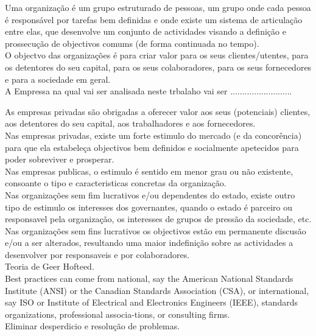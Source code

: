 Uma organização é um grupo estruturado de pessoas, um grupo onde cada pessoa é responsável por tarefas bem definidas e onde existe um sistema de articulação entre elas, que desenvolve um conjunto de actividades visando a definição e prossecução de objectivos comums (de forma continuada no tempo).\\

O objectvo das organizações é para criar valor para os seus clientes/utentes, para os detentores do seu capital, para os seus colaboradores, para os seus fornecedores e para a sociedade em geral.\\

A Empressa na qual vai ser analisada neste trbalaho vai ser ..........................

As empresas privadas são obrigadas a oferecer valor aos seus (potenciais) clientes, aos detentores do seu capital, aos trabalhadores e aos fornecedores.\\
Nas empresas privadas, existe um forte estimulo do mercado (e da concorência) para que ela estabeleça objectivos bem definidos e socialmente apetecidos para poder sobreviver e prosperar.\\

Nas empresas publicas, o estimulo é sentido em menor grau ou não existente, consoante o tipo e caracteristicas concretas da organização.\\

Nas organizações sem fim lucrativos e/ou dependentes do estado, existe outro tipo de estimulo os interesses dos governantes, quando o estado é parceiro ou responsavel pela organização, os interesses de grupos de pressão da sociedade, etc.\\

Nas organizações sem fins lucrativos os objectivos estão em permanente discusão e/ou a ser alterados, resultando uma maior indefinição sobre as actividades a desenvolver por responsaveis e por colaboradores.\\

Teoria de Geer Hofteed.\\

Best practices can come from national, say the American National Standards Institute (ANSI) or the Canadian Standards Association (CSA), or international, say ISO or Institute of Electrical and Electronics Engineers (IEEE), standards organizations, professional associa-tions, or consulting firms.\\

Eliminar desperdicio e resolução de problemas.\\

